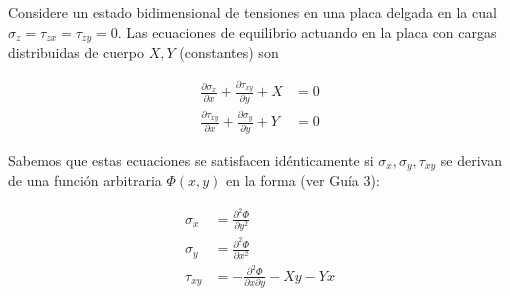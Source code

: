 \documentclass[a4paper,10pt,twoside,final,spanish]{article}
\begin{document}
Considere un estado bidimensional de tensiones en una placa delgada en la cual $\sigma_{z}=\tau_{zx}=\tau_{zy}=0$. Las ecuaciones de equilibrio actuando en la placa  con cargas distribuidas de cuerpo $X,Y$ (constantes) son

\begin{align*}
\frac{\partial\sigma_{x}}{\partial x}
+\frac{\partial\tau_{xy}}{\partial y}+X &= 0 \\
\frac{\partial\tau_{xy}}{\partial x}
+\frac{\partial\sigma_{y}}{\partial y}+Y &= 0
\end{align*}
 
Sabemos que estas ecuaciones se satisfacen idénticamente si $\sigma_{x},\sigma_{y},\tau_{xy}$ se derivan de una función arbitraria  $\Phi(x,y)$ en la forma (ver Guía 3): 

\begin{align*}
\sigma_x &= \frac{\partial^{2}\Phi}{\partial y^{2}} \\
\sigma_y &= \frac{\partial^{2}\Phi}{\partial x^{2}} \\
\tau_{xy} &= -\frac{\partial^{2}\Phi}{\partial x \partial y}-Xy-Yx
\end{align*}
\end{document}
